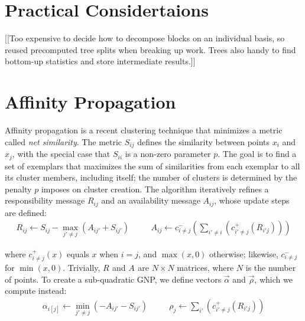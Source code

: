 \documentclass{article}
\newcommand{\cpos}[2]{c^{+}_{#1 \neq #2}}
\newcommand{\cneg}[2]{c^{-}_{#1 \neq #2}}
\newcommand{\respo}[2]{R_{#1#2}}
\newcommand{\avail}[2]{A_{#1#2}}
\newcommand{\simil}[2]{S_{#1#2}}
\newcommand{\vecrho}{\vec{\rho}}
\newcommand{\vecalpha}{\vec{\alpha}}
\newcommand{\frho}[1]{\rho_{#1}}
\newcommand{\falphaj}[2]{\alpha_{#1[#2]}}
\begin{document}

\section{Practical Considertaions}

[[Too expensive to decide how to decompose blocks on an individual
basis, so reused precomputed tree splits when breaking up work.  Trees
also handy to find bottom-up statistics and store intermediate
results.]]

\section{Affinity Propagation}


Affinity propagation\cite{affinity} is a recent clustering technique that minimizes a metric called {\it net similarity}.
The metric $\simil{i}{j}$ defines the similarity between points $x_i$ and $x_j$, with the special case that $\simil{i}{i}$ is a non-zero parameter $p$.
The goal is to find a set of exemplars that maximizes the sum of similarities from each exemplar to all its cluster members, including itself; the number of clusters is determined by the penalty $p$ imposes on cluster creation.
The algorithm iteratively refines a responsibility message $\respo{i}{j}$ and an availability message $\avail{i}{j}$, whose update steps are defined:
\begin{equation*}
  \begin{array}{lcr}
    \respo{i}{j} \gets \simil{i}{j} - \max_{j' \neq j} (\avail{i}{j'} + \simil{i}{j'})
    &\quad&
    \avail{i}{j} \gets \cneg{i}{j}( \sum_{i' \neq i} ( \cpos{i'}{j}(\respo{i'}{j}) ) )
  \end{array}
\end{equation*}


\noindent where $\cpos{i}{j}(x)$ equals $x$ when $i=j$, and $\max(x,0)$ otherwise; likewise, $\cneg{i}{j}$ for $\min(x, 0)$.
Trivially, $\respo{}{}$ and $\avail{}{}$ are $N \times N$ matrices, where $N$ is the number of points.
To create a sub-quadratic GNP, we define vectors $\vecalpha$ and $\vecrho$, which we compute instead:
\begin{equation*}
  \begin{array}{lcr}
    \falphaj{i}{j} \gets \min_{j' \neq j} (-\avail{i}{j'} - \simil{i}{j'})
    &\quad&
    \frho{j} \gets \sum_{i'} ( \cpos{i'}{j}(\respo{i'}{j}) )
  \end{array}
\end{equation*}
\end{document}
